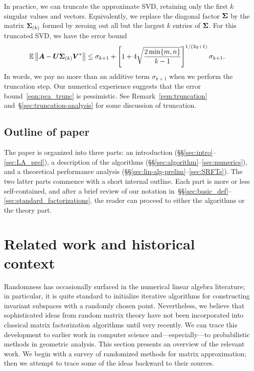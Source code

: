 \documentclass[final]{siamltex}
\newcounter{algorithm}[section]
\newcommand{\pgnotate}[1]{{\color{blue}[#1]}}
\begin{document}
In practice, we can truncate the approximate SVD, retaining only the
first $k$ singular values and vectors.  Equivalently, we
replace the diagonal factor $\bm{\Sigma}$ by the matrix
$\bm{\Sigma}_{(k)}$ formed by zeroing out all but the
largest $k$ entries of $\bm{\Sigma}$.  For this truncated SVD, we have the error bound
\begin{equation} \label{eqn:pca_trunc}
\Expect \norm{ \mtx{A} - \mtx{U} \mtx{\Sigma}_{(k)} \mtx{V}^\adj }
	\leq \sigma_{k+1} + \left[ 1 + 4 \sqrt{\frac{2\min\{m,n\}}{k-1}} \right]^{1/(2q+1)} \sigma_{k+1}.
\end{equation}
In words, we pay no more than an additive term $\sigma_{k+1}$ when we
perform the truncation step.  Our numerical experience suggests that
the error bound~\eqref{eqn:pca_trunc} is pessimistic.
See Remark~\ref{rem:truncation} and~\S\ref{sec:truncation-analysis} for some
discussion of truncation.


\subsection{Outline of paper}

The paper is organized into three parts: an introduction
(\S\S\ref{sec:intro}--\ref{sec:LA_prel}), a description of the
algorithms (\S\S\ref{sec:algorithm}--\ref{sec:numerics}), and
a theoretical performance analysis (\S\S\ref{sec:lin-alg-prelim}--\ref{sec:SRFTs}).
The two latter parts commence with a short internal outline.
Each part is more or less self-contained, and after a brief review of our notation
in~\S\S\ref{sec:basic_def}--\ref{sec:standard_factorizations},
the reader can proceed to either the algorithms or the theory part.

\lsp

\section{Related work and historical context}
\label{sec:related}

Randomness has occasionally surfaced in the numerical linear algebra
literature; in particular, it is quite standard to initialize
iterative algorithms for constructing invariant subspaces with a randomly
chosen point.  Nevertheless, we believe that sophisticated ideas from
random matrix theory have not been incorporated into classical matrix
factorization algorithms until very recently.  We can trace this
development to earlier work in computer science and---especially---to
probabilistic methods in geometric analysis.
This section presents an overview of the relevant work.
We begin with a survey of randomized methods for matrix approximation;
then we attempt to trace some of the ideas backward to their sources.
\end{document}
